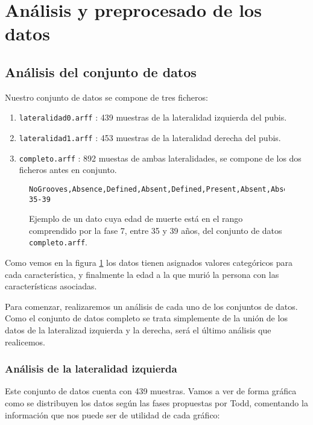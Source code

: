 \section{Análisis y preprocesado de los datos}

\subsection{Análisis del conjunto de datos}

Nuestro conjunto de datos se compone de tres ficheros:

\begin{enumerate}
	\item \texttt{lateralidad0.arff} : 439 muestras de la lateralidad izquierda del pubis.
	\item \texttt{lateralidad1.arff} : 453 muestras de la lateralidad derecha del pubis.
	\item \texttt{completo.arff} : 892 muestas de ambas lateralidades, se compone de los dos ficheros antes en conjunto.
\end{enumerate}

\begin{figure}[H]
	\begin{lstlisting}[language={}]
	NoGrooves,Absence,Defined,Absent,Defined,Present,Absent,Absent,FormedWithoutRarefactions,Ph07-35-39
	\end{lstlisting}
	\caption{Ejemplo de un dato cuya edad de muerte está en el rango comprendido por la fase 7, entre 35 y 39 años, del conjunto de datos \texttt{completo.arff}.}
	\label{fig:ejemplo_dato}
\end{figure}

Como vemos en la figura \ref{fig:ejemplo_dato} los datos tienen asignados valores categóricos para cada característica, y finalmente la edad a la que murió la persona con las características asociadas.

Para comenzar, realizaremos un análisis de cada uno de los conjuntos de datos. Como el conjunto de datos completo se trata simplemente de la unión de los datos de la lateralizad izquierda y la derecha, será el último análisis que realicemos.

\subsubsection{Análisis de la lateralidad izquierda}

Este conjunto de datos cuenta con 439 muestras. Vamos a ver de forma gráfica como se distribuyen los datos según las fases propuestas por Todd, comentando la información que nos puede ser de utilidad de cada gráfico:

